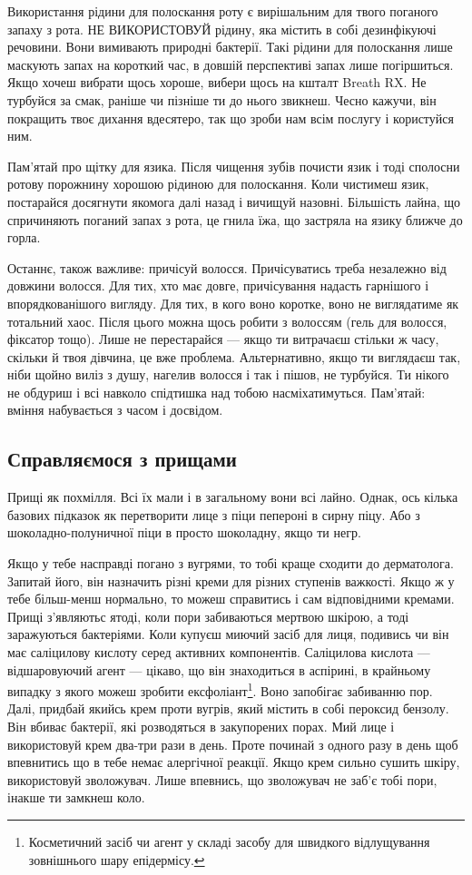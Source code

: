 Використання рідини для полоскання роту є вирішальним для твого поганого запаху
з рота. НЕ ВИКОРИСТОВУЙ рідину, яка містить в собі дезинфікуючі речовини. Вони
вимивають природні бактерії. Такі рідини для полоскання лише маскують запах
на короткий час, в довшій перспективі запах лише погіршиться. Якщо хочеш
вибрати щось хороше, вибери щось на кшталт Breath RX. Не турбуйся за смак,
раніше чи пізніше ти до нього звикнеш. Чесно кажучи, він покращить твоє дихання
вдесятеро, так що зроби нам всім послугу і користуйся ним.

Пам’ятай про щітку для язика. Після чищення зубів почисти язик і тоді сполосни
ротову порожнину хорошою рідиною для полоскання. Коли чистимеш язик, постарайся
досягнути якомога далі назад і вичищуй назовні. Більшість лайна, що спричиняють
поганий запах з рота, це гнила їжа, що застряла на язику ближче до горла.

Останнє, також важливе: причісуй волосся. Причісуватись треба незалежно від
довжини волосся. Для тих, хто має довге, причісування надасть гарнішого і
впорядкованішого вигляду. Для тих, в кого воно коротке, воно не виглядатиме як
тотальний хаос. Після цього можна щось робити з волоссям (гель для волосся,
фіксатор тощо). Лише не перестарайся — якщо ти витрачаєш стільки ж часу,
скільки й твоя дівчина, це вже проблема. Альтернативно, якщо ти виглядаєш так,
ніби щойно виліз з душу, нагелив волосся і так і пішов, не турбуйся. Ти нікого
не обдуриш і всі навколо спідтишка над тобою насміхатимуться. Пам’ятай: вміння
набувається з часом і досвідом.

\subsection{Справляємося з прищами}
Прищі як похмілля. Всі їх мали і в загальному вони всі лайно. Однак, ось кілька
базових підказок як перетворити лице з піци пепероні в сирну піцу. Або з
шоколадно-полуничної піци в просто шоколадну, якщо ти негр.

Якщо у тебе насправді погано з вугрями, то тобі краще сходити до дерматолога.
Запитай його, він назначить різні креми для різних ступенів важкості. Якщо ж
у тебе більш-менш нормально, то можеш справитись і сам відповідними кремами.
Прищі з’являютьс ятоді, коли пори забиваються мертвою шкірою, а тоді
заражуються бактеріями. Коли купуєш миючий засіб для лиця, подивись чи він має
саліцилову кислоту серед активних компонентів. Саліцилова кислота —
відшаровуючий агент — цікаво, що він знаходиться в аспірині, в крайньому
випадку з якого можеш зробити ексфоліант\footnote{Косметичний засіб чи агент
у складі засобу для швидкого відлущування зовнішнього шару епідермісу.}. Воно
запобігає забиванню пор. Далі, придбай якийсь крем проти вугрів, який містить
в собі пероксид бензолу. Він вбиває бактерії, які розводяться в закупорених
порах. Мий лице і використовуй крем два-три рази в день. Проте починай з одного
разу в день щоб впевнитись що в тебе немає алергічної реакції. Якщо крем сильно
сушить шкіру, використовуй зволожувач. Лише впевнись, що зволожувач не заб’є
тобі пори, інакше ти замкнеш коло.

